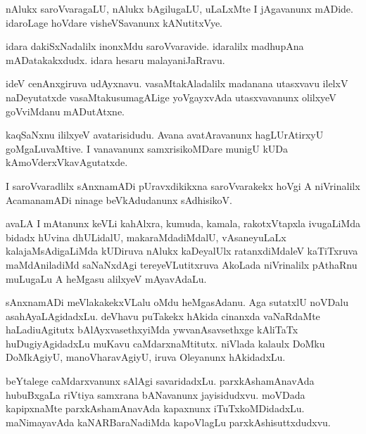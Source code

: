 \documentclass{article}
\begin{document}
\begin{mn}%
nAlukx saroVvaragaLU, nAlukx bAgilugaLU,  uLaLxMte I jAgavanunx mADide. idaroLage hoVdare 
visheVSavanunx kANutitxVye.
\end{mn}

\begin{mn}%
idara dakiSxNadalilx inonxMdu saroVvaravide. idaralilx madhupAna mADatakakxdudx. idara 
hesaru malayaniJaRravu.
\end{mn}

\begin{mn}%
ideV cenAnxgiruva udAyxnavu. vasaMtakAladalilx madanana utasxvavu ilelxV naDeyutatxde 
vasaMtakusumagALige yoVgayxvAda utasxvavanunx olilxyeV goVviMdanu mADutAtxne.
\end{mn}

\begin{mn}%
kaqSaNxnu ililxyeV avatarisidudu. Avana avatAravanunx hagLUrAtirxyU goMgaLuvaMtive. I 
vanavanunx samxrisikoMDare munigU kUDa kAmoVderxVkavAgutatxde.
\end{mn}

\begin{mn}%
I saroVvaradlilx sAnxnamADi pUravxdikikxna saroVvarakekx hoVgi A niVrinalilx AcamanamADi 
ninage beVkAdudanunx sAdhisikoV.
\end{mn}

\begin{mn}%
avaLA I mAtanunx keVLi kahAlxra, kumuda, kamala, rakotxVtapxla ivugaLiMda bidadx hUvina 
dhULidalU, makaraMdadiMdalU, vAsaneyuLaLx kalajaMsAdigaLiMda kUDiruva nAlukx kaDeyalUlx 
ratanxdiMdaleV kaTiTxruva maMdAniladiMd saNaNxdAgi tereyeVLutitxruva AkoLada niVrinalilx 
pAthaRnu muLugaLu A heMgasu alilxyeV mAyavAdaLu.
\end{mn}

\begin{mn}%
sAnxnamADi meVlakakekxVLalu oMdu heMgasAdanu. Aga sutatxlU noVDalu asahAyaLAgidadxLu. 
deVhavu puTakekx hAkida cinanxda vaNaRdaMte haLadiuAgitutx bAlAyxvasethxyiMda 
ywvanAsavsethxge kAliTaTx huDugiyAgidadxLu muKavu caMdarxnaMtitutx. niVlada kalaulx DoMku 
DoMkAgiyU, manoVharavAgiyU, iruva Oleyanunx hAkidadxLu.
\end{mn}

\begin{mn}%
beYtalege caMdarxvanunx sAlAgi savaridadxLu. parxkAshamAnavAda hubuBxgaLa riVtiya samxrana 
bANavanunx jayisidudxvu. moVDada kapipxnaMte parxkAshamAnavAda kapaxnunx iTuTxkoMDidadxLu. 
maNimayavAda kaNARBaraNadiMda kapoVlagLu parxkAshisuttxdudxvu.
\end{mn}
\end{document}

